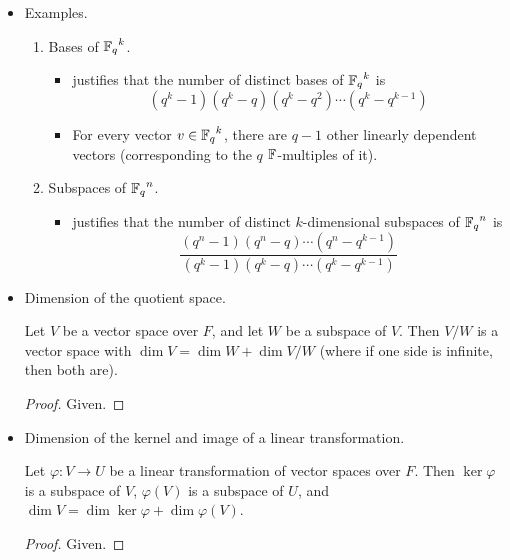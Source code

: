 \documentclass[../notes.tex]{subfiles}
\begin{document}
\begin{itemize}
    \item Examples.
    \begin{enumerate}
        \item Bases of ${\mathbb{F}_q}^k$.
        \begin{itemize}
            \item \textcite{bib:DummitFoote} justifies that the number of distinct bases of ${\mathbb{F}_q}^k$ is
            \begin{equation*}
                (q^k-1)(q^k-q)(q^k-q^2)\cdots(q^k-q^{k-1})
            \end{equation*}
            \item For every vector $v\in{\mathbb{F}_q}^k$, there are $q-1$ other linearly dependent vectors (corresponding to the $q$ $\mathbb{F}$-multiples of it).
        \end{itemize}
        \item Subspaces of ${\mathbb{F}_q}^n$.
        \begin{itemize}
            \item \textcite{bib:DummitFoote} justifies that the number of distinct $k$-dimensional subspaces of ${\mathbb{F}_q}^n$ is
            \begin{equation*}
                \frac{(q^n-1)(q^n-q)\cdots(q^n-q^{k-1})}{(q^k-1)(q^k-q)\cdots(q^k-q^{k-1})}
            \end{equation*}
        \end{itemize}
    \end{enumerate}
    \item Dimension of the quotient space.
    \begin{theorem}\label{trm:11.7}
        Let $V$ be a vector space over $F$, and let $W$ be a subspace of $V$. Then $V/W$ is a vector space with $\dim V=\dim W+\dim V/W$ (where if one side is infinite, then both are).
        \begin{proof}
            Given.
        \end{proof}
    \end{theorem}
    \item Dimension of the kernel and image of a linear transformation.
    \begin{corollary}\label{cly:11.8}
        Let $\varphi:V\to U$ be a linear transformation of vector spaces over $F$. Then $\ker\varphi$ is a subspace of $V$, $\varphi(V)$ is a subspace of $U$, and $\dim V=\dim\ker\varphi+\dim\varphi(V)$.
        \begin{proof}
            Given.
        \end{proof}
    \end{corollary}

\end{itemize}
\end{document}
